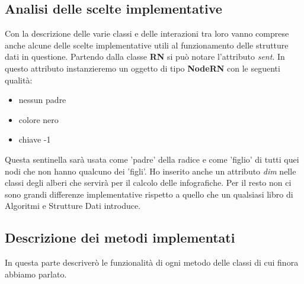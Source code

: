 \subsection{Analisi delle scelte implementative}
\label{sec:AnalisiScelteImplementative_1}
Con la descrizione delle varie classi e delle interazioni tra loro vanno comprese anche alcune delle scelte implementative utili al funzionamento delle strutture dati in questione. Partendo dalla classe \textbf{RN} si può notare l'attributo \textit{sent}. In questo attributo instanzieremo un oggetto di tipo \textbf{NodeRN} con le seguenti qualità:

\begin{itemize}
    \item nessun padre
    \item colore nero
    \item chiave -1
\end{itemize}

Questa sentinella sarà usata come 'padre' della radice e come 'figlio' di tutti quei nodi che non hanno qualcuno dei 'figli'. Ho inserito anche un attributo \textit{dim} nelle classi degli alberi che servirà per il calcolo delle infografiche. Per il resto non ci sono grandi differenze implementative rispetto a quello che un qualsiasi libro di Algoritmi e Strutture Dati introduce.

\subsection{Descrizione dei metodi implementati}
\label{sec:DescrizioneMetodiImplementati_1}
In questa parte descriverò le funzionalità di ogni metodo delle classi di cui finora abbiamo parlato. 

